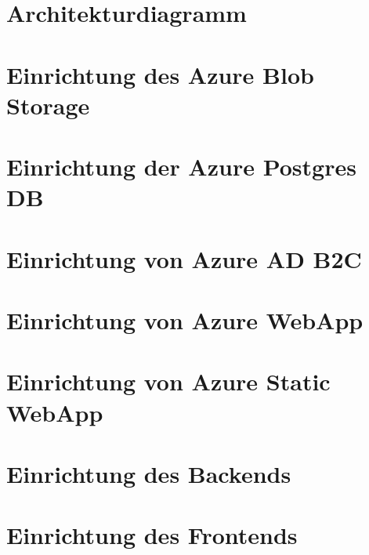 
\section{Architekturdiagramm}

\section{Einrichtung des Azure Blob Storage}

\section{Einrichtung der Azure Postgres DB}

\section{Einrichtung von Azure AD B2C}

\section{Einrichtung von Azure WebApp}

\section{Einrichtung von Azure Static WebApp}

\section{Einrichtung des Backends}


\section{Einrichtung des Frontends}

